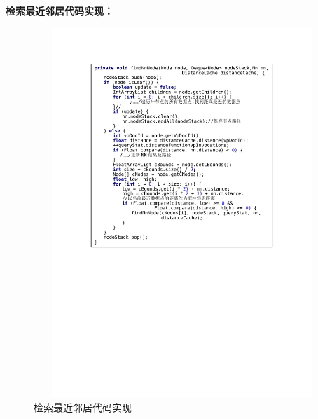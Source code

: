 \textbf{检索最近邻居代码实现：}
\begin{figure}[H]
  \centering
  \includegraphics[width=5.8in,height=5.5in]{new_FIGs/chapter4/findnn-code.pdf}
  \caption{检索最近邻居代码实现}\label{findnn-code}
\end{figure}

